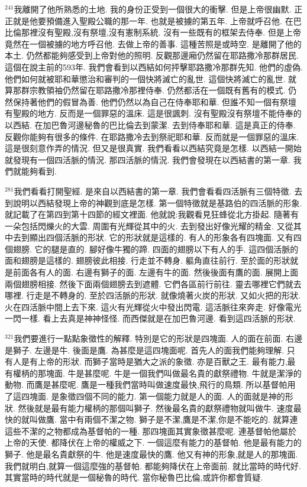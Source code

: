 \documentclass{book}
\begin{document}
$^{241}$我離開了他所熟悉的土地.
我的身份正受到一個很大的衝擊.
但是上帝很幽默.
正正就是他要預備進入聖殿公職的那一年.
也就是被擄的第五年.
上帝就呼召他.
在巴比倫那裡沒有聖殿,沒有祭壇,沒有憲制系統.
沒有一些既有的框架去侍奉.
但是上帝竟然在一個被擄的地方呼召他.
去做上帝的善事.
這種苦照是或時空.
是離開了他的本土.
仍然都能夠感受到上帝對他的照明.
反觀那邊廂仍然留在耶路撒冷那群居民.
這個在說主前的593年.
我們會看到以西結如何抨擊耶路撒冷那群先知.
他們的虛偽.
他們如何就被耶和華懲治和審判的一個快將滅亡的亂世.
這個快將滅亡的亂世.
就算那群宗教領袖仍然留在耶路撒冷那裡侍奉.
仍然都活在一個既有舊有的模式.
仍然保持著他們的假冒為善.
他們仍然以為自己在侍奉耶和華.
但誰不知一個有祭壇有聖殿的地方.
反而是一個罪惡的溫床.
這是很諷刺.
沒有聖殿沒有祭壇不能侍奉的以西結.
在加巴魯河邊秘魯的巴比倫去到蒙潔.
去到侍奉耶和華.
這是真正的侍奉.
反觀你能夠有很多的條件.
在耶路撒冷去到祭祀耶和華.
反而就是一個罪惡的溫床.
這是很刻意作弄的情況.
但又是很真實.
我們看看以西結究竟是怎樣.
以西結一開始就發現有一個四活脈的情況.
那四活脈的情況.
我們會發現在以西結書的第一章.
我們就能夠看到.

$^{281}$我們看看打開聖經.
是來自以西結書的第一章.
我們會看看四活脈有三個特徵.
去到說明以西結發現上帝的神觀到底是怎樣.
第一個特徵就是基路伯的四活脈的形象.
就記載了在第四到第十四節的經文裡面.
他就說:我觀看見狂蜂從北方掛起.
隨著有一朵包括閃爍火的大雲.
周圍有光輝從其中的火.
去到發出好像光耀的精金.
又從其中去到顯出四個活脈的形狀.
它的形狀就是這樣的.
有人的形象各有四塊面.
又有四個翅膀.
它的腿是直的.
腳好像牛獨的蹄.
四面的翅膀以下有人的手.
這四個活脈的面和翅膀是這樣的.
翅膀彼此相接.
行走並不轉身.
軀角直往前行.
至於面的形狀就是前面各有人的面.
右邊有獅子的面.
左邊有牛的面.
然後後面有鷹的面.
展開上面兩個翅膀相接.
然後下面兩個翅膀去到遮體.
它們各區前行前往.
靈去哪裡它們就去哪裡.
行走是不轉身的.
至於四活脈的形狀.
就像燒著火炭的形狀.
又如火把的形狀.
火在四活脈中間上去下來.
這火有光輝從火中發出閃電.
這活脈往來奔走.
好像電光一閃一樣.
看上去真是神神怪怪.
而西傑就是在加巴魯河邊.
看到這四活脈的形狀.

$^{321}$我們要進行一點點象徵性的解釋.
特別是它的形狀是四塊面.
人的面在前面.
右邊是獅子.
左邊是牛.
後面是鷹.
為甚麼是這四塊面呢.
首先人的面我們能夠理解.
只有人是有上帝的形狀.
而獅子當時是猶大之派的象徵.
亦是百獸之王.
最有能力,最有權柄的那塊面.
牛是甚麼呢.
牛是一個我們叫做最名貴的獻祭禮物.
牛就是潔淨的動物.
而鷹是甚麼呢.
鷹是一種我們當時叫做速度最快,飛行的鳥類.
所以基督帕用了這四塊面.
是象徵四個不同的能力.
第一個能力就是人的面.
人的面就是神的形狀.
然後就是最有能力權柄的那個叫獅子.
然後最名貴的獻祭禮物就叫做牛.
速度最快的就叫做鷹.
當中有兩個不潔之物.
獅子是不潔,鷹是不潔,你是不能吃的.
就算連這些不潔的之物都成為基督帕的一種.
那四塊面其實象徵甚麼呢.
連基督帕他屬於上帝的天使.
都降伏在上帝的權威之下.
一個這麼有能力的基督帕.
他是最有能力的獅子.
他是最名貴獻祭的牛.
他是速度最快的鷹.
他又有神的形象,就是人的那塊面.
我們就明白,就算一個這麼強的基督帕.
都能夠降伏在上帝面前.
就比當時的時代好.
其實當時的時代就是一個秘魯的時代.
當你秘魯巴比倫,或許你都會質疑.
\end{document}
